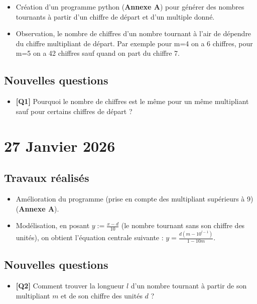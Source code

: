\documentclass[a4paper,12pt]{article}
\begin{document}
\begin{itemize}[label=\textbullet]
    \item Création d'un programme python (\textbf{Annexe A}) pour générer des nombres tournants à partir d'un chiffre de départ et d'un multiple donné.
    \item Observation, le nombre de chiffres d'un nombre tournant à l'air de dépendre du chiffre multipliant de départ.
    Par exemple pour m=4 on a 6 chiffres, pour m=5 on a 42 chiffres sauf quand on part du chiffre 7.
\end{itemize}

\subsection*{Nouvelles questions}

\begin{itemize}[label=\textbullet]
    \item \textbf{[Q1]} Pourquoi le nombre de chiffres est le même pour un même multipliant sauf pour certains chiffres de départ ?
\end{itemize}

\clearpage

\section{27 Janvier 2026}

\subsection*{Travaux réalisés}

\begin{itemize}[label=\textbullet]
    \item Amélioration du programme (prise en compte des multipliant supérieurs à 9) (\textbf{Annexe A}).
    \item Modélisation, en posant $y := \frac{x - d}{10}$ (le nombre tournant sans son chiffre des unités), on obtient l'équation centrale suivante : $y = \frac{d(m - 10^{l - 1})}{1 - 10m}$.
\end{itemize}

\subsection*{Nouvelles questions}

\begin{itemize}[label=\textbullet]
    \item \textbf{[Q2]} Comment trouver la longueur $l$ d'un nombre tournant à partir de son multipliant $m$ et de son chiffre des unités $d$ ?
\end{itemize}
\end{document}
